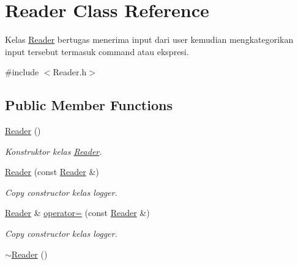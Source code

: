 \hypertarget{class_reader}{}\section{Reader Class Reference}
\label{class_reader}


Kelas \hyperlink{class_reader}{Reader} bertugas menerima input dari user kemudian mengkategorikan input tersebut termasuk command atau ekspresi.  




{\ttfamily \#include $<$Reader.\+h$>$}

\subsection*{Public Member Functions}
\begin{DoxyCompactItemize}
\item 
\hypertarget{class_reader_adcda31b507720ab44044d7a21686fba2}{}\hyperlink{class_reader_adcda31b507720ab44044d7a21686fba2}{Reader} ()\label{class_reader_adcda31b507720ab44044d7a21686fba2}

\begin{DoxyCompactList}\small\item\em Konstruktor kelas \hyperlink{class_reader}{Reader}. \end{DoxyCompactList}\item 
\hyperlink{class_reader_a22be4123536f4d9a5432290fabb8971c}{Reader} (const \hyperlink{class_reader}{Reader} \&)
\begin{DoxyCompactList}\small\item\em Copy constructor kelas logger. \end{DoxyCompactList}\item 
\hyperlink{class_reader}{Reader} \& \hyperlink{class_reader_ace806a7f7b055341c10af595fedcd5f4}{operator=} (const \hyperlink{class_reader}{Reader} \&)
\begin{DoxyCompactList}\small\item\em Copy constructor kelas logger. \end{DoxyCompactList}\item 
\hypertarget{class_reader_a78089542fd27a0ac2df6702fffe8725c}{}\hyperlink{class_reader_a78089542fd27a0ac2df6702fffe8725c}{$\sim$\+Reader} ()\label{class_reader_a78089542fd27a0ac2df6702fffe8725c}


\end{DoxyCompactItemize}
